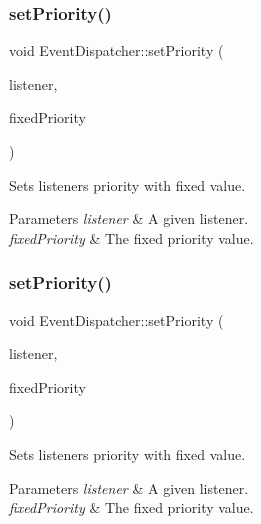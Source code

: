 \subsubsection{\texorpdfstring{set\+Priority()}{setPriority()}\hspace{0.1cm}{\footnotesize\ttfamily [1/2]}}
{\footnotesize\ttfamily void Event\+Dispatcher\+::set\+Priority (\begin{DoxyParamCaption}\item[{\hyperlink{classEventListener}{Event\+Listener} $\ast$}]{listener,  }\item[{int}]{fixed\+Priority }\end{DoxyParamCaption})}

Sets listener\textquotesingle{}s priority with fixed value.


\begin{DoxyParams}{Parameters}
{\em listener} & A given listener. \\
\hline
{\em fixed\+Priority} & The fixed priority value. \\
\hline
\end{DoxyParams}
\mbox{\label{classEventDispatcher_a8368f3f3945977b5a5c3d0cc75f90cd5}} 
\subsubsection{\texorpdfstring{set\+Priority()}{setPriority()}\hspace{0.1cm}{\footnotesize\ttfamily [2/2]}}
{\footnotesize\ttfamily void Event\+Dispatcher\+::set\+Priority (\begin{DoxyParamCaption}\item[{\hyperlink{classEventListener}{Event\+Listener} $\ast$}]{listener,  }\item[{int}]{fixed\+Priority }\end{DoxyParamCaption})}

Sets listener\textquotesingle{}s priority with fixed value.


\begin{DoxyParams}{Parameters}
{\em listener} & A given listener. \\
\hline
{\em fixed\+Priority} & The fixed priority value. \\
\hline
\end{DoxyParams}
\mbox{\label{classEventDispatcher_ab194c90a0a72abc2e53f922abc1fa7e4}} 
